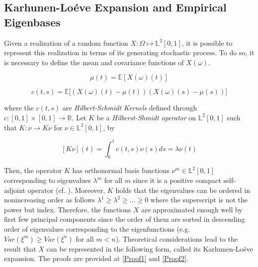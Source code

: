 \documentclass[11pt,twoside,a4paper]{article}
\begin{document}
	\subsection{Karhunen-Lo\'{e}ve Expansion and Empirical Eigenbases}\hypertarget{KL}{}
	Given a realization of a random function $X: \Omega \mapsto \mathbb{L}^2[0,1]$, it is possible to represent this realization in terms of its generating stochastic process. To do so, it is necessary to define the mean and covariance functions of $X(\omega)$.
	
	\begin{equation}\label{MeanFunction}
		\mu(t) = \mathbb{E}\left[ X(\omega)(t) \right]
	\end{equation}
	
	\begin{equation}\label{CovarianceFunction}
		c(t,s) = \mathbb{E}\big[ \left( X(\omega)(t) - \mu(t) \right) \left( X(\omega)(s) - \mu(s) \right) \big]
	\end{equation}

	where the $c(t,s)$ are \textit{Hilbert-Schmidt Kernels} defined through $c : [0,1] \times [0,1] \rightarrow \mathbb{R}$. Let $K$ be a \textit{Hilberst-Shmidt operator} on $\mathbb{L}^{2}[0,1]$ such that $K : \nu \rightarrow K \nu$ for $\nu \in \mathbb{L}^{2}[0,1]$, by
	
	\begin{equation}\label{HSKernal}
		[K \nu](t) = \int_{0}^{1}c(t,s) \nu(s)ds = \lambda \nu(t)
	\end{equation}
	
	Then, the operator $K$ has orthonormal basis functions $\nu^{m} \in \mathbb{L}^{2}[0,1]$ corresponding to eigenvalues $\lambda^{m}$ for all $m$ since it is a positive compact self-adjoint operator (cf. \cite{alexanderian_KLexpansion_2015}). Moreover, $K$ holds that the eigenvalues can be ordered in nonincreasing order as follows $\lambda^{1} \geq \lambda^{2} \geq \dots \geq 0$ where the superscript is not the power but index. Therefore, the functions $X$ are approximated enough well by first few principal components since the order of them are sorted in descending order of eigenvalues corresponding to the eigenfunctions (e.g. $Var(\xi^{m}) \geq Var(\xi^{n})$ for all $m < n$). Theoretical considerations lead to the result that $X$ can be represented in the following form, called its Karhunen-Lo\'{e}ve expansion. The proofs are provided at \ref{Proof1} and \ref{Proof2}.
	
\end{document}
